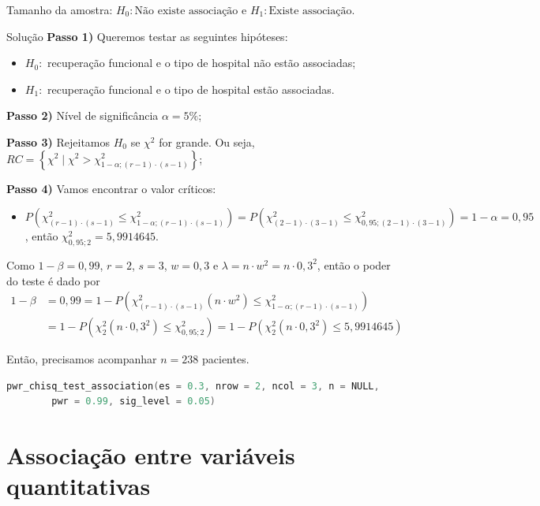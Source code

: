 \documentclass[9pt]{beamer}
\begin{document}
\begin{frame}[fragile]{Tamanho da amostra: $H_0:\mbox{Não existe associação}$ e $H_1:\mbox{Existe associação} $.}

\scriptsize
\begin{block}{Solução}
	\textbf{Passo 1)} Queremos testar as seguintes hipóteses:
	\begin{itemize}
		\item $H_0:$ recuperação funcional e o tipo de hospital não estão associadas;
		\item $H_1:$ recuperação funcional e o tipo de hospital estão associadas.
	\end{itemize}
	
	\textbf{Passo 2)} Nível de significância $\alpha=5\%$;
	
	\textbf{Passo 3)} Rejeitamos $H_0$ se $\chi^2$ for grande. Ou seja, $RC =\left\{ \chi^2 \mid \chi^2 > \chi^2_{1-\alpha; (r-1)\cdot (s-1)} \right\}$;
	
	\textbf{Passo 4)} Vamos encontrar o valor críticos:
	\begin{itemize}
		\item $P\left( \chi^2_{(r-1)\cdot (s-1)} \leq \chi^2_{1-\alpha;(r-1)\cdot (s-1)} \right) = P\left( \chi^2_{(2-1)\cdot (3-1)} \leq \chi^2_{0,95;(2-1)\cdot (3-1)} \right) = \allowbreak 1-\alpha=0,95$, então $\chi^2_{0,95;2} = 5,9914645$.
	\end{itemize}
	
	Como $1-\beta=0,99$, $r=2$, $s=3$, $w=0,3$ e $\lambda = n \cdot w^2 = n \cdot 0,3^2$, então o poder do teste é dado por
	\begin{align*}
	1-\beta &= 0,99 = 1 - P\left( \chi_{(r-1)\cdot (s-1)}^2(n \cdot w^2) \leq \chi_{1-\alpha; (r-1)\cdot (s-1)}^2 \right)\\
	&= 1 - P\left( \chi_{2}^2(n \cdot 0,3^2) \leq \chi_{0,95; 2}^2 \right) = 1 - P\left( \chi_{2}^2(n \cdot 0,3^2) \leq 5,9914645 \right)
	\end{align*}
\end{block}
Então, precisamos acompanhar $n=238$ pacientes.

\begin{lstlisting}[language = C, caption = Código no R.]
pwr_chisq_test_association(es = 0.3, nrow = 2, ncol = 3, n = NULL,
		pwr = 0.99, sig_level = 0.05)
\end{lstlisting}
\normalsize

\end{frame}

\section{Associação entre variáveis quantitativas}
\end{document}
